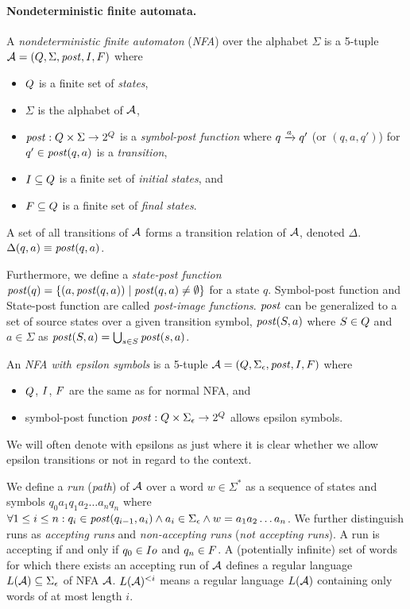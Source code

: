 \paragraph{Nondeterministic finite automata.}
A \emph{nondeterministic finite automaton} (\emph{NFA}) over the alphabet $\Sigma$ is a 5-tuple $\mathcal{A} = (Q, \Sigma, \mathit{post}, I, F)$ where
\begin{itemize}
    \item $Q$ is a finite set of \emph{states},
    \item $\Sigma$ is the alphabet of $\mathcal{A}$,
    \item $\mathit{post}: Q \times \Sigma \rightarrow 2^{Q}$ is a \emph{symbol-post function} where ${q} \xrightarrow{{a}} {q'}$ (or $(q, a, q')$) for $q' \in \mathit{post}(q, a)$ is a \emph{transition},
    \item $I \subseteq Q$ is a finite set of \emph{initial states}, and
    \item $F \subseteq Q$ is a finite set of \emph{final states}.
\end{itemize}

A set of all transitions of $\mathcal{A}$ forms a transition relation of $\mathcal{A}$, denoted $\Delta$. $\Delta(q, a) \equiv \mathit{post}(q, a)$.

Furthermore, we define a \emph{state-post function} $\mathit{post}(q) = \{ (a, \mathit{post}(q, a)) \mid \mathit{post}(q, a) \neq \emptyset \}$ for a state $q$.
Symbol-post function and State-post function are called \emph{post-image functions}.
$\mathit{post}$ can be generalized to a set of source states over a given transition symbol, $\mathit{post}(S, a)$ where $S \in Q$ and $a \in \Sigma$ as $\mathit{post}(S, a) = \bigcup_{s \in S} \mathit{post}(s, a)$.


An \emph{NFA with epsilon symbols} is a 5-tuple $\mathcal{A} = (Q, \Sigma_\epsilon, \mathit{post}, I, F)$ where
\begin{itemize}
    \item $Q$, $I$, $F$ are the same as for normal NFA, and
    \item symbol-post function $\mathit{post}: Q \times \Sigma_\epsilon \rightarrow 2^{Q}$ allows epsilon symbols.
\end{itemize}
We will often denote \nfa with epsilons as just \nfa where it is clear whether we allow epsilon transitions or not in regard to the context.

We define a \emph{run} (\emph{path}) of $\mathcal{A}$ over a word $w \in \Sigma^*$ as a sequence of states and symbols $q_0a_1q_1a_2\ldots a_nq_n$ where $\forall 1 \leq i \leq n: q_i \in \mathit{post}(q_{i-1}, a_i) \land a_i \in \Sigma_\epsilon \land w = a_1a_2\ldots a_n$.
We further distinguish runs as \emph{accepting runs} and \emph{non-accepting runs} (\emph{not accepting runs}).
A run is accepting if and only if $q_0 \in I  o$ and $q_n \in F$.
A (potentially infinite) set of words for which there exists an accepting run of $\mathcal{A}$ defines a regular language $L(\mathcal{A}) \subseteq \Sigma_\epsilon$ of NFA $\mathcal{A}$. $L(\mathcal{A})^{<i}$ means a regular language $L(\mathcal{A})$ containing only words of at most length $i$.

